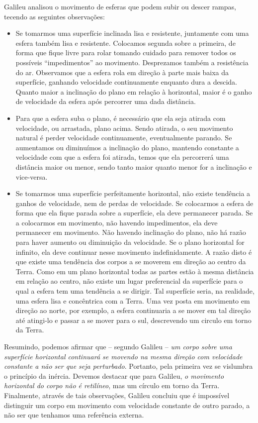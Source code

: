 Galileu analisou o movimento de esferas que podem subir ou descer rampas, tecendo as seguintes observações:
\begin{itemize}
  \item Se tomarmos uma superfície inclinada lisa e resistente, juntamente com uma esfera também lisa e resistente. Colocamos segunda sobre a primeira, de forma que fique livre para rolar tomando cuidado para remover todos os possíveis ``impedimentos'' ao movimento. Desprezamos também a resistência do ar. Observamos que a esfera rola em direção à parte mais baixa da superfície, ganhando velocidade continuamente enquanto dura a descida. Quanto maior a inclinação do plano em relação à horizontal, maior é o ganho de velocidade da esfera após percorrer uma dada distância.
  \item Para que a esfera suba o plano, é necessário que ela seja atirada com velocidade, ou arrastada, plano acima. Sendo atirada, o seu movimento natural é perder velocidade continuamente, eventualmente parando. Se aumentamos ou diminuímos a inclinação do plano, mantendo constante a velocidade com que a esfera foi atirada, temos que ela percorrerá uma distância maior ou menor, sendo tanto maior quanto menor for a inclinação e vice-versa.
  \item Se tomarmos uma superfície perfeitamente horizontal, não existe tendência a ganhos de velocidade, nem de perdas de velocidade. Se colocarmos a esfera de forma que ela fique parada sobre a superfície, ela deve permanecer parada. Se a colocarmos em movimento, não havendo impedimentos, ela deve permanecer em movimento. Não havendo inclinação do plano, não há razão para haver aumento ou diminuição da velocidade. Se o plano horizontal for infinito, ela deve continuar nesse movimento indefinidamente. A razão disto é que existe uma tendência dos corpos a se moverem em direção ao centro da Terra. Como em um plano horizontal todas as partes estão à mesma distância em relação ao centro, não existe um lugar preferencial da superfície para o qual a esfera tem uma tendência a se dirigir. Tal superfície seria, na realidade, uma esfera lisa e concêntrica com a Terra. Uma vez posta em movimento em direção ao norte, por exemplo, a esfera continuaria a se mover em tal direção até atingi-lo e passar a se mover para o sul, descrevendo um circulo em torno da Terra.
\end{itemize}
%
Resumindo, podemos afirmar que -- segundo Galileu -- \emph{um corpo sobre uma superfície horizontal continuará se movendo na mesma direção com velocidade constante a não ser que seja perturbado}. Portanto, pela primeira vez se vislumbra o princípio da inércia. Devemos destacar que para Galileu, \emph{o movimento horizontal do corpo não é retilíneo}, mas um círculo em torno da Terra. Finalmente, através de tais observações, Galileu concluiu que é impossível distinguir um corpo em movimento com velocidade constante de outro parado, a não ser que tenhamos uma referência externa.

